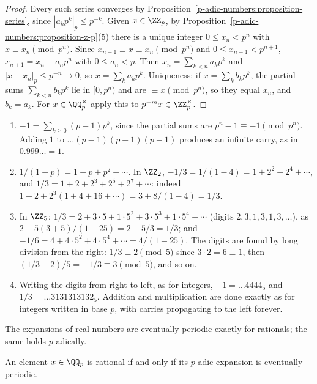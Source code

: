 \begin{proof}
Every such series converges by Proposition~\ref{p-adic-numbers:proposition-series}, since $|a_kp^k|_p \leq p^{-k}$. Given $x \in \ZZ_p$, by Proposition~\ref{p-adic-numbers:proposition-z-p}(5) there is a unique
integer $0 \leq x_n < p^n$ with $x \equiv x_n \pmod{p^n}$. Since $x_{n+1} \equiv x \equiv x_n \pmod{p^n}$ and $0 \leq x_{n+1} < p^{n+1}$, $x_{n+1} = x_n + a_np^n$ with $0 \leq a_n < p$. Then
$x_n = \sum_{k < n}a_kp^k$ and $|x - x_n|_p \leq p^{-n} \to 0$, so $x = \sum_ka_kp^k$. Uniqueness: if $x = \sum_kb_kp^k$, the partial sums $\sum_{k < n}b_kp^k$ lie in $[0, p^n)$ and are $\equiv x \pmod{p^n}$,
so they equal $x_n$, and $b_k = a_k$. For $x \in \QQ_p^\times$ apply this to $p^{-m}x \in \ZZ_p^\times$.
\end{proof}

\begin{example}\label{p-adic-numbers:example-expansions}
\begin{enumerate}
\item $-1 = \sum_{k \geq 0}(p - 1)p^k$, since the partial sums are $p^n - 1 \equiv -1 \pmod{p^n}$. Adding $1$ to $\ldots(p-1)(p-1)(p-1)$ produces an infinite carry, as in $0.999\ldots = 1$.
\item $1/(1 - p) = 1 + p + p^2 + \cdots$. In $\ZZ_2$, $-1/3 = 1/(1 - 4) = 1 + 2^2 + 2^4 + \cdots$, and $1/3 = 1 + 2 + 2^3 + 2^5 + 2^7 + \cdots$: indeed
$1 + 2 + 2^3(1 + 4 + 16 + \cdots) = 3 + 8/(1 - 4) = 1/3$.
\item In $\ZZ_5$: $1/3 = 2 + 3 \cdot 5 + 1 \cdot 5^2 + 3 \cdot 5^3 + 1 \cdot 5^4 + \cdots$ (digits $2, 3, 1, 3, 1, 3, \ldots$), as $2 + 5(3 + 5)/(1 - 25) = 2 - 5/3 = 1/3$; and
$-1/6 = 4 + 4 \cdot 5^2 + 4 \cdot 5^4 + \cdots = 4/(1 - 25)$. The digits are found by long division from the right: $1/3 \equiv 2 \pmod 5$ since $3 \cdot 2 = 6 \equiv 1$, then
$(1/3 - 2)/5 = -1/3 \equiv 3 \pmod 5$, and so on.
\item Writing the digits from right to left, as for integers, $-1 = \ldots 4444_5$ and $1/3 = \ldots 3131313132_5$. Addition and multiplication are done exactly as for integers written in base $p$,
with carries propagating to the left forever.
\end{enumerate}
\end{example}

The expansions of real numbers are eventually periodic exactly for rationals; the same holds $p$-adically.

\begin{proposition}\label{p-adic-numbers:proposition-rational-periodic}
An element $x \in \QQ_p$ is rational if and only if its $p$-adic expansion is eventually periodic.
\end{proposition}

